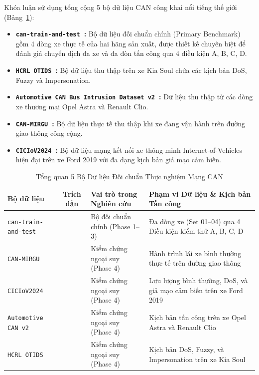 \documentclass[12pt, a4paper, reqno, oneside]{book}
\begin{document}
Khóa luận sử dụng tổng cộng 5 bộ dữ liệu CAN công khai nổi tiếng thế giới (Bảng~\ref{tab:datasets_overview}):
\begin{itemize}
    \item \textbf{\texttt{can-train-and-test}~\cite{lampe2023cantrain,lampe2024curated}:} Bộ dữ liệu đối chuẩn chính (Primary Benchmark) gồm 4 dòng xe thực tế của hai hãng sản xuất, được thiết kế chuyên biệt để đánh giá chuyển dịch đa xe và đa đòn tấn công qua 4 điều kiện A, B, C, D.
    \item \textbf{\texttt{HCRL OTIDS}~\cite{lee2017otids}:} Bộ dữ liệu thu thập trên xe Kia Soul chứa các kịch bản DoS, Fuzzy và Impersonation.
    \item \textbf{\texttt{Automotive CAN Bus Intrusion Dataset v2}~\cite{dupont2019automotive}:} Dữ liệu thu thập từ các dòng xe thương mại Opel Astra và Renault Clio.
    \item \textbf{\texttt{CAN-MIRGU}~\cite{rajapaksha2024canmirgu}:} Bộ dữ liệu thực tế thu thập khi xe đang vận hành trên đường giao thông công cộng.
    \item \textbf{\texttt{CICIoV2024}~\cite{neto2024ciciov2024}:} Bộ dữ liệu mạng kết nối xe thông minh Internet-of-Vehicles hiện đại trên xe Ford 2019 với đa dạng kịch bản giả mạo cảm biến.
\end{itemize}

\begin{table}[htbp]
\caption{Tổng quan 5 Bộ Dữ liệu Đối chuẩn Thực nghiệm Mạng CAN}
\label{tab:datasets_overview}
\centering
\renewcommand{\arraystretch}{1.25}
\small
\begin{tabularx}{\textwidth}{p{3.2cm} c p{4.0cm} X}
\hline
\textbf{Bộ dữ liệu} & \textbf{Trích dẫn} & \textbf{Vai trò trong Nghiên cứu} & \textbf{Phạm vi Dữ liệu \& Kịch bản Tấn công} \\
\hline
\texttt{can-train-and-test} & \cite{lampe2023cantrain,lampe2024curated} & Bộ đối chuẩn chính (Phase 1--3) & Đa dòng xe (Set 01--04) qua 4 Điều kiện kiểm thử A, B, C, D \\
\texttt{CAN-MIRGU} & \cite{rajapaksha2024canmirgu} & Kiểm chứng ngoại suy (Phase 4) & Hành trình lái xe bình thường thực tế trên đường giao thông \\
\texttt{CICIoV2024} & \cite{neto2024ciciov2024} & Kiểm chứng ngoại suy (Phase 4) & Lưu lượng bình thường, DoS, và giả mạo cảm biến trên xe Ford 2019 \\
\texttt{Automotive CAN v2} & \cite{dupont2019automotive} & Kiểm chứng ngoại suy (Phase 4) & Kịch bản tấn công trên xe Opel Astra và Renault Clio \\
\texttt{HCRL OTIDS} & \cite{lee2017otids} & Kiểm chứng ngoại suy (Phase 4) & Kịch bản DoS, Fuzzy, và Impersonation trên xe Kia Soul \\
\hline
\end{tabularx}
\end{table}
\end{document}
